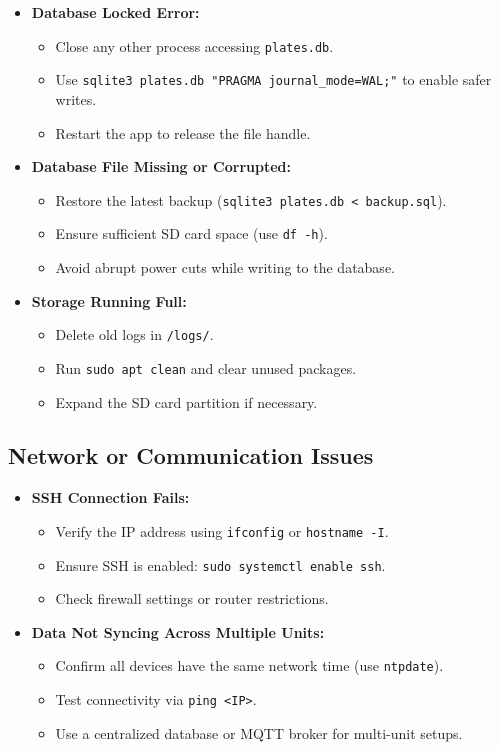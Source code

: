 \begin{itemize}
	\item \textbf{Database Locked Error:}  
	\begin{itemize}
		\item Close any other process accessing \texttt{plates.db}.  
		\item Use \texttt{sqlite3 plates.db "PRAGMA journal\_mode=WAL;"} to enable safer writes.  
		\item Restart the app to release the file handle.
	\end{itemize}
	
	\item \textbf{Database File Missing or Corrupted:}  
	\begin{itemize}
		\item Restore the latest backup (\texttt{sqlite3 plates.db < backup.sql}).  
		\item Ensure sufficient SD card space (use \texttt{df -h}).  
		\item Avoid abrupt power cuts while writing to the database.
	\end{itemize}
	
	\item \textbf{Storage Running Full:}  
	\begin{itemize}
		\item Delete old logs in \texttt{/logs/}.  
		\item Run \texttt{sudo apt clean} and clear unused packages.  
		\item Expand the SD card partition if necessary.
	\end{itemize}
\end{itemize}

\subsection{Network or Communication Issues}

\begin{itemize}
	\item \textbf{SSH Connection Fails:}  
	\begin{itemize}
		\item Verify the IP address using \texttt{ifconfig} or \texttt{hostname -I}.  
		\item Ensure SSH is enabled: \texttt{sudo systemctl enable ssh}.  
		\item Check firewall settings or router restrictions.
	\end{itemize}
	
	\item \textbf{Data Not Syncing Across Multiple Units:}  
	\begin{itemize}
		\item Confirm all devices have the same network time (use \texttt{ntpdate}).  
		\item Test connectivity via \texttt{ping <IP>}.  
		\item Use a centralized database or MQTT broker for multi-unit setups.
	\end{itemize}
\end{itemize}

